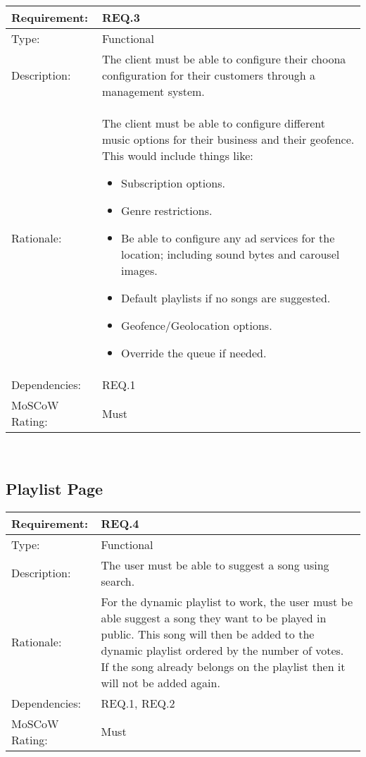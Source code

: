 \noindent
\begin{tabular}{|l || p{12.0cm}|}
  \hline
  Requirement:       & REQ.3 \\ \hline
  Type:              & Functional \\ \hline
  Description:       & The client must be able to configure their choona configuration for their customers through a management system. \\ \hline
  Rationale:         & The client must be able to configure different music options for their business and their geofence. This would include things like:
  \begin{itemize}
  \item Subscription options.
  \item Genre restrictions.
  \item Be able to configure any ad services for the location; including sound bytes and carousel images.
  \item Default playlists if no songs are suggested.
  \item Geofence/Geolocation options.
  \item Override the queue if needed.
  \end{itemize}
 \\ \hline
  Dependencies:      & REQ.1 \\ \hline
  MoSCoW Rating:     & Must \\
\hline
\end{tabular}\\

\vspace{0.5cm}
\subsection*{Playlist Page}

\noindent
\begin{tabular}{|l || p{12.0cm}|}
  \hline
  Requirement:       & REQ.4 \\ \hline
  Type:              & Functional \\ \hline
  Description:       & The user must be able to suggest a song using search. \\ \hline
  Rationale:         & For the dynamic playlist to work, the user must be able suggest a song they want to be played in public. This song will then be added to the dynamic playlist ordered by the number of votes. If the song already belongs on the playlist then it will not be added again. \\ \hline
  Dependencies:      & REQ.1, REQ.2 \\ \hline
  MoSCoW Rating:     & Must \\
\hline
\end{tabular}\\

